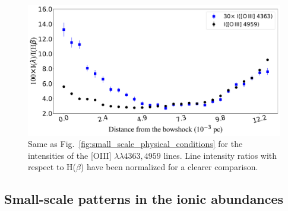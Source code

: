 \documentclass[twocolumn,linenumbers]{aastex63}
\begin{document}
\begin{figure}
\centering
\includegraphics[width=\columnwidth]{O3lines_distribution.pdf}
\caption{Same as Fig.~\ref{fig:small_scale_physical_conditions} for the intensities of the [O\thinspace III] $\lambda \lambda 4363, 4959$ lines. Line intensity ratios with respect to H($\beta$) have been normalized for a clearer comparison.}
\label{fig:O3_lines}
\end{figure}






\subsection{Small-scale patterns in the ionic abundances}
\label{subsec:small_scale_ca}
\end{document}
